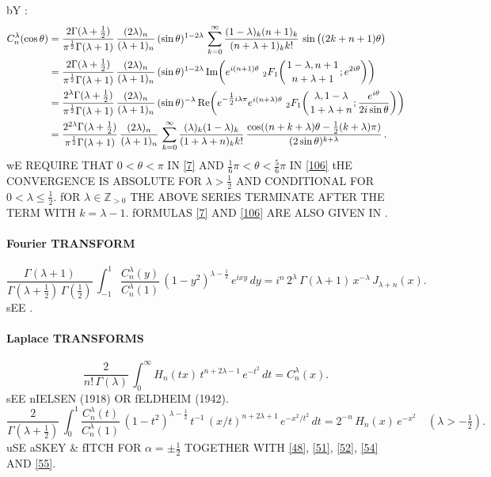 \documentclass[twoside,11pt]{article}
\newcommand\ZZ{\mathbb{Z}}
\newcommand\al\alpha
\newcommand\tha\theta
\newcommand\la\lambda
\newcommand\Ga{\Gamma}
\newcommand\half{\frac12}
\newcommand\thalf{\tfrac12}
\newcommand\iy\infty
\newcommand\Zpos{\ZZ_{>0}}
\newcommand{\hyp}[5]{\,\mbox{}_{#1}F_{#2}\!\left( 
  \genfrac{}{}{0pt}{}{#3}{#4};#5\right)}
\renewcommand\Re{{\rm Re}\,}
\renewcommand\Im{{\rm Im}\,}
\begin{document}
bY \mycite{DLMF}{(14.13.1), (14.3.21), (15.8.1)]}: 
\begin{align} 
C_n^\la(\cos\tha)&=\frac{2\Ga(\la+\thalf)}{\pi^\half\Ga(\la+1)}\, 
\frac{(2\la)_n}{(\la+1)_n}\,(\sin\tha)^{1-2\la}\, 
\sum_{k=0}^\iy\frac{(1-\la)_k(n+1)_k}{(n+\la+1)_k k!}\, 
\sin\big((2k+n+1)\tha\big) 
\label{7}\\ 
&=\frac{2\Ga(\la+\thalf)}{\pi^\half\Ga(\la+1)}\, 
\frac{(2\la)_n}{(\la+1)_n}\,(\sin\tha)^{1-2\la}\, 
\Im\!\!\left(e^{i(n+1)\tha}\,\hyp21{1-\la,n+1}{n+\la+1}{e^{2i\tha}}\right)\nonumber\\ 
&=\frac{2^\la\Ga(\la+\thalf)}{\pi^\half\Ga(\la+1)}\, 
\frac{(2\la)_n}{(\la+1)_n}\,(\sin\tha)^{-\la}\, 
\Re\!\!\left(e^{-\thalf i\la\pi}e^{i(n+\la)\tha}\, 
\hyp21{\la,1-\la}{1+\la+n}{\frac{e^{i\tha}}{2i\sin\tha}}\right)\nonumber\\ 
&=\frac{2^{2\la}\Ga(\la+\thalf)}{\pi^\half\Ga(\la+1)}\,\frac{(2\la)_n}{(\la+1)_n}\, 
\sum_{k=0}^\iy\frac{(\la)_k(1-\la)_k}{(1+\la+n)_k k!}\, 
\frac{\cos((n+k+\la)\tha-\thalf(k+\la)\pi)}{(2\sin\tha)^{k+\la}}\,. 
\label{106} 
\end{align} 
wE REQUIRE THAT $0<\tha<\pi$ IN \eqref{7} AND $\tfrac16\pi<\tha<\tfrac56\pi$ IN 
\eqref{106} tHE CONVERGENCE IS ABSOLUTE FOR $\la>\thalf$ AND CONDITIONAL FOR 
$0<\la\le\thalf$. 
fOR $\la\in\Zpos$ THE ABOVE SERIES TERMINATE AFTER THE TERM WITH 
$k=\la-1$. 
fORMULAS \eqref{7} AND \eqref{106} ARE ALSO GIVEN IN 
. 
% 
\paragraph{Fourier TRANSFORM} 
\begin{equation} 
\frac{\Ga(\la+1)}{\Ga(\la+\thalf)\,\Ga(\thalf)}\, 
\int_{-1}^1 \frac{C_n^\la(y)}{C_n^\la(1)}\,(1-y^2)^{\la-\half}\, 
e^{ixy}\,dy 
=i^n\,2^\la\,\Ga(\la+1)\,x^{-\la}\,J_{\la+n}(x). 
\label{8} 
\end{equation} 
sEE . 
% 
\paragraph{Laplace TRANSFORMS} 
\begin{equation} 
\frac2{n!\,\Ga(\la)}\, 
\int_0^\iy H_n(tx)\,t^{n+2\la-1}\,e^{-t^2}\,dt=C_n^\la(x). 
\label{56} 
\end{equation} 
sEE nIELSEN \cite[p.48, (4) WITH P.47, (1) AND P.28, (10)]{k4} (1918) 
OR fELDHEIM \cite[(28)]{K3} (1942). 
\begin{equation} 
\frac2{\Ga(\la+\thalf)}\,\int_0^1 \frac{C_n^\la(t)}{C_n^\la(1)}\, 
(1-t^2)^{\la-\half}\,t^{-1}\,(x/t)^{n+2\la+1}\,e^{-x^2/t^2}\,dt 
=2^{-n}\,H_n(x)\,e^{-x^2}\quad(\la>-\thalf). 
\label{46} 
\end{equation} 
uSE aSKEY \& fITCH \cite[(3.29)]{K2} FOR $\al=\pm\thalf$ TOGETHER WITH 
\eqref{48}, \eqref{51}, \eqref{52}, \eqref{54} AND \eqref{55}. 
\end{document}
